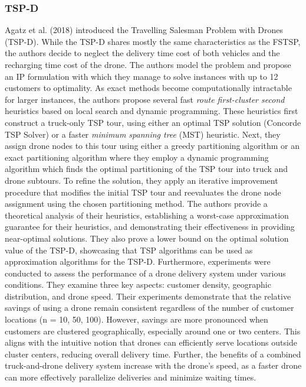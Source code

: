 \documentclass{article}
\begin{document}
	\subsubsection{TSP-D}
	Agatz et al. (2018) \cite{Agatz2018} introduced the Travelling Salesman Problem with Drones (TSP-D). While the TSP-D shares mostly the same characteristics as the FSTSP, the authors decide to neglect the delivery time cost of both vehicles and the recharging time cost of the drone. The authors model the problem and propose an IP formulation with which they manage to solve instances with up to 12 customers to optimality. As exact methods become computationally intractable for larger instances, the authors propose several fast \textit{route first-cluster second} heuristics based on local search and dynamic programming. These heuristics first construct a truck-only TSP tour, using either an optimal TSP solution (Concorde TSP Solver) or a faster \textit{minimum spanning tree} (MST) heuristic. Next, they assign drone nodes to this tour using either a greedy partitioning algorithm or an exact partitioning algorithm where they employ a dynamic programming algorithm which finds the optimal partitioning of the TSP tour into truck and drone subtours. To refine the solution, they apply an iterative improvement procedure that modifies the initial TSP tour and reevaluates the drone node assignment using the chosen partitioning method. 
	The authors provide a theoretical analysis of their heuristics, establishing a worst-case approximation guarantee for their heuristics, and demonstrating their effectiveness in providing near-optimal solutions. They also prove a lower bound on the optimal solution value of the TSP-D, showcasing that TSP algorithms can be used as approximation algorithms for the TSP-D. Furthermore, experiments were conducted to assess the performance of a drone delivery system under various conditions. They examine three key aspects: customer density, geographic distribution, and drone speed. Their experiments demonstrate that the relative savings of using a drone remain consistent regardless of the number of customer locations (n = 10, 50, 100). However, savings are more pronounced when customers are clustered geographically, especially around one or two centers. This aligns with the intuitive notion that drones can efficiently serve locations outside cluster centers, reducing overall delivery time. Further, the benefits of a combined truck-and-drone delivery system increase with the drone's speed, as a faster drone can more effectively parallelize deliveries and minimize waiting times.
	
\end{document}
